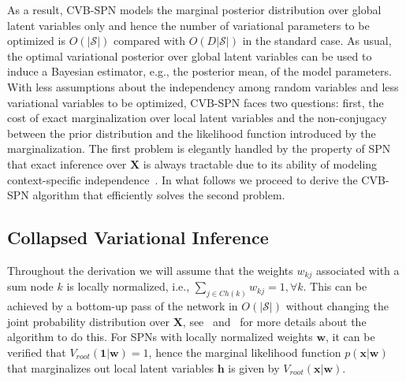 \documentclass{article} %
\theoremstyle{definition}
\begin{document}
As a result, CVB-SPN models the marginal posterior distribution over global latent variables only and hence the number of variational parameters to be optimized is $O(|\mathcal{S}|)$ compared with $O(D|\mathcal{S}|)$ in the standard case. As usual, the optimal variational posterior over global latent variables can be used to induce a Bayesian estimator, e.g., the posterior mean, of the model parameters. With less assumptions about the independency among random variables and less variational variables to be optimized, CVB-SPN faces two questions: first, the cost of exact marginalization over local latent variables and the non-conjugacy between the prior distribution and the likelihood function introduced by the marginalization.    The first problem is elegantly handled by the property of SPN that exact inference over $\mathbf{X}$ is always tractable due to its ability of modeling context-specific independence~\cite{boutilier1996context}. In what follows we proceed to derive the CVB-SPN algorithm that efficiently solves the second problem.

\subsection{Collapsed Variational Inference}
Throughout the derivation we will assume that the weights $w_{kj}$ associated with a sum node $k$ is locally normalized, i.e., $\sum_{j\in Ch(k)}w_{kj} = 1, \forall k$. This can be achieved by a bottom-up pass of the network in $O(|\mathcal{S}|)$ without changing the joint probability distribution over $\mathbf{X}$, see~\citet{peharz2015foundations} and~\citet{zhao2015spnbn} for more details about the algorithm to do this. For SPNs with locally normalized weights $\mathbf{w}$, it can be verified that $V_{root}(\mathbf{1}|\mathbf{w}) = 1$, hence the marginal likelihood function $p(\mathbf{x}|\mathbf{w})$ that marginalizes out local latent variables $\mathbf{h}$ is given by $V_{root}(\mathbf{x}|\mathbf{w})$. 
\end{document}
